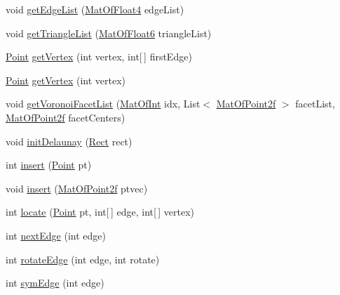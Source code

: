 \begin{DoxyCompactItemize}
\item 
void \mbox{\hyperlink{classorg_1_1opencv_1_1imgproc_1_1_subdiv2_d_acc4709236533b8f54829e77b1fdc91f3}{get\+Edge\+List}} (\mbox{\hyperlink{classorg_1_1opencv_1_1core_1_1_mat_of_float4}{Mat\+Of\+Float4}} edge\+List)
\item 
void \mbox{\hyperlink{classorg_1_1opencv_1_1imgproc_1_1_subdiv2_d_a4e772bf7eeec11ef789b445c485bf4ba}{get\+Triangle\+List}} (\mbox{\hyperlink{classorg_1_1opencv_1_1core_1_1_mat_of_float6}{Mat\+Of\+Float6}} triangle\+List)
\item 
\mbox{\hyperlink{classorg_1_1opencv_1_1core_1_1_point}{Point}} \mbox{\hyperlink{classorg_1_1opencv_1_1imgproc_1_1_subdiv2_d_a58c403c768834b543ef6f813f748be12}{get\+Vertex}} (int vertex, int\mbox{[}$\,$\mbox{]} first\+Edge)
\item 
\mbox{\hyperlink{classorg_1_1opencv_1_1core_1_1_point}{Point}} \mbox{\hyperlink{classorg_1_1opencv_1_1imgproc_1_1_subdiv2_d_af326c77ee5406972650418ddda481fc7}{get\+Vertex}} (int vertex)
\item 
void \mbox{\hyperlink{classorg_1_1opencv_1_1imgproc_1_1_subdiv2_d_a48829316fa03d30c1dcd95f5dddf25d7}{get\+Voronoi\+Facet\+List}} (\mbox{\hyperlink{classorg_1_1opencv_1_1core_1_1_mat_of_int}{Mat\+Of\+Int}} idx, List$<$ \mbox{\hyperlink{classorg_1_1opencv_1_1core_1_1_mat_of_point2f}{Mat\+Of\+Point2f}} $>$ facet\+List, \mbox{\hyperlink{classorg_1_1opencv_1_1core_1_1_mat_of_point2f}{Mat\+Of\+Point2f}} facet\+Centers)
\item 
void \mbox{\hyperlink{classorg_1_1opencv_1_1imgproc_1_1_subdiv2_d_a8f12a6f7f41d7efd750f0bfc9a574d90}{init\+Delaunay}} (\mbox{\hyperlink{classorg_1_1opencv_1_1core_1_1_rect}{Rect}} rect)
\item 
int \mbox{\hyperlink{classorg_1_1opencv_1_1imgproc_1_1_subdiv2_d_aac9c8eacdac3bcc8346cac08a0ce06e9}{insert}} (\mbox{\hyperlink{classorg_1_1opencv_1_1core_1_1_point}{Point}} pt)
\item 
void \mbox{\hyperlink{classorg_1_1opencv_1_1imgproc_1_1_subdiv2_d_aa95284b221d6b0c5338bfa1ed04db76c}{insert}} (\mbox{\hyperlink{classorg_1_1opencv_1_1core_1_1_mat_of_point2f}{Mat\+Of\+Point2f}} ptvec)
\item 
int \mbox{\hyperlink{classorg_1_1opencv_1_1imgproc_1_1_subdiv2_d_af8c8b676d79b7cea1d19c6a931d90c63}{locate}} (\mbox{\hyperlink{classorg_1_1opencv_1_1core_1_1_point}{Point}} pt, int\mbox{[}$\,$\mbox{]} edge, int\mbox{[}$\,$\mbox{]} vertex)
\item 
int \mbox{\hyperlink{classorg_1_1opencv_1_1imgproc_1_1_subdiv2_d_aeb95cdc777f3a9a182d896a8be6f6182}{next\+Edge}} (int edge)
\item 
int \mbox{\hyperlink{classorg_1_1opencv_1_1imgproc_1_1_subdiv2_d_a31aa122175e559b7e3c565edfec48277}{rotate\+Edge}} (int edge, int rotate)
\item 
int \mbox{\hyperlink{classorg_1_1opencv_1_1imgproc_1_1_subdiv2_d_a3386e5ffc9193f2cff46ab87a86e41a0}{sym\+Edge}} (int edge)
\end{DoxyCompactItemize}
